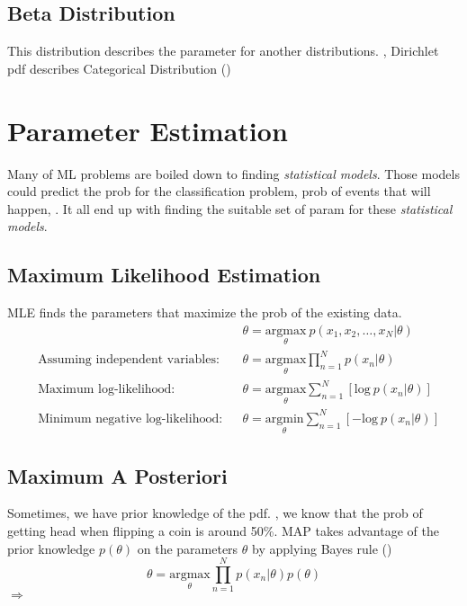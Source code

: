 \subsection{Beta Distribution}
This distribution describes the parameter for another distributions. \Eg, Dirichlet \ac{pdf} describes Categorical Distribution ()

\section{Parameter Estimation}
Many of \ac{ML} problems are boiled down to finding \textit{statistical models}. Those models could predict the \ac{prob} for the classification problem, \ac{prob} of events that will happen, \etc. It all end up with finding the suitable set of \ac{param} for these \textit{statistical models}.
\subsection{Maximum Likelihood Estimation}
\ac{MLE} finds the parameters that maximize the \ac{prob} of the existing data.
\begin{align}
	& &&\theta = \underset{\theta}{\text{argmax}}\:p(x_1, x_2, \dots, x_N | \theta) \\
	&\text{Assuming independent variables:} &&\theta = \underset{\theta}{\text{argmax}} \prod^N_{n=1} p(x_n | \theta) \\
	&\text{Maximum log-likelihood:} &&\theta = \underset{\theta}{\text{argmax}} \sum^N_{n=1} \left[\text{log}\:p(x_n | \theta) \right]\\
	&\text{Minimum negative log-likelihood:} && \theta = \underset{\theta}{\text{argmin}} \sum^N_{n=1} \left[-\text{log}\:p(x_n | \theta)\right]
\end{align}

\subsection{Maximum A Posteriori}
Sometimes, we have prior knowledge of the \ac{pdf}. \Eg, we know that the \ac{prob} of getting head when flipping a coin is around 50\%. \ac{MAP} takes advantage of the prior knowledge $p(\theta)$ on the parameters $\theta$ by applying Bayes rule ()
\begin{equation}
	\theta = \underset{\theta}{\text{argmax}} \prod^N_{n=1} p(x_n | \theta)p(\theta)
\end{equation}
 $\Rightarrow$ 


